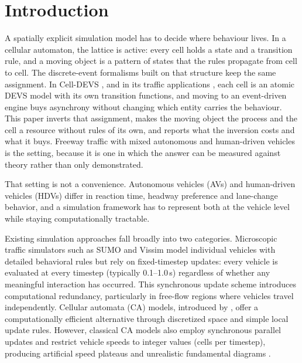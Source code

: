 \documentclass[review,number]{elsarticle}
\begin{document}
\section{Introduction}
\label{sec:introduction}

A spatially explicit simulation model has to decide where behaviour lives. In a cellular automaton, the lattice is active: every cell holds a state and a transition rule, and a moving object is a pattern of states that the rules propagate from cell to cell. The discrete-event formalisms built on that structure keep the same assignment. In Cell-DEVS \citep{wainer2001timed,wainer2014cellular}, and in its traffic applications \citep{davidson2000specifying,wainer2006atlas}, each cell is an atomic DEVS model with its own transition functions, and moving to an event-driven engine buys asynchrony without changing which entity carries the behaviour. This paper inverts that assignment, makes the moving object the process and the cell a resource without rules of its own, and reports what the inversion costs and what it buys. Freeway traffic with mixed autonomous and human-driven vehicles is the setting, because it is one in which the answer can be measured against theory rather than only demonstrated.

That setting is not a convenience. Autonomous vehicles (AVs) and human-driven vehicles (HDVs) differ in reaction time, headway preference and lane-change behavior, and a simulation framework has to represent both at the vehicle level while staying computationally tractable.

Existing simulation approaches fall broadly into two categories. Microscopic traffic simulators such as SUMO \citep{lopez2018microscopic} and Vissim \citep{fellendorf2010microscopic} model individual vehicles with detailed behavioral rules but rely on fixed-timestep updates: every vehicle is evaluated at every timestep (typically 0.1--1.0\,s) regardless of whether any meaningful interaction has occurred. This synchronous update scheme introduces computational redundancy, particularly in free-flow regions where vehicles travel independently. Cellular automata (CA) models, introduced by \citet{nagel1992cellular}, offer a computationally efficient alternative through discretized space and simple local update rules. However, classical CA models also employ synchronous parallel updates and restrict vehicle speeds to integer values (cells per timestep), producing artificial speed plateaus and unrealistic fundamental diagrams \citep{maerivoet2005cellular}.
\end{document}
